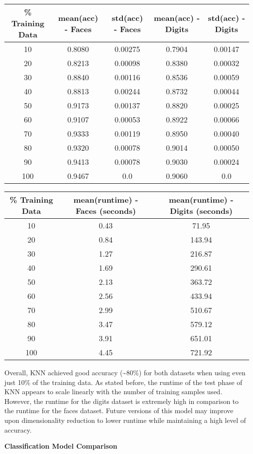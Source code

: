 \documentclass[11pt]{article}
\begin{document}
    \begin{center}
    \begin{tabular}{||c|c c|c c||}
     \hline
     \% Training Data & mean(acc) - Faces & std(acc) - Faces & mean(acc) - Digits & std(acc) - Digits \\ [0.5ex]
     \hline\hline
     10 & 0.8080 & 0.00275 & 0.7904 & 0.00147 \\
     \hline
     20 & 0.8213 & 0.00098 & 0.8380 & 0.00032 \\
     \hline
     30 & 0.8840 & 0.00116 & 0.8536 & 0.00059 \\
     \hline
     40 & 0.8813 & 0.00244 & 0.8732 & 0.00044 \\
     \hline
     50 & 0.9173 & 0.00137 & 0.8820 & 0.00025 \\
     \hline
     60 & 0.9107 & 0.00053 & 0.8922 & 0.00066 \\
     \hline
     70 & 0.9333 & 0.00119 & 0.8950 & 0.00040 \\
     \hline
     80 & 0.9320 & 0.00078 & 0.9014 & 0.00050 \\
     \hline
     90 & 0.9413 & 0.00078 & 0.9030 & 0.00024 \\
     \hline
     100 & 0.9467 & 0.0 & 0.9060 & 0.0 \\
     \hline
    \end{tabular}
    \begin{tabular}{||c|c|c||}
     \hline
     \% Training Data & mean(runtime) - Faces (seconds) & mean(runtime) - Digits (seconds) \\ [0.5ex]
     \hline\hline
     10 & 0.43 & 71.95 \\
     \hline
     20 & 0.84 & 143.94 \\
     \hline
     30 & 1.27 & 216.87 \\
     \hline
     40 & 1.69 & 290.61 \\
     \hline
     50 & 2.13 & 363.72 \\
     \hline
     60 & 2.56 & 433.94 \\
     \hline
     70 & 2.99 & 510.67 \\
     \hline
     80 & 3.47 & 579.12 \\
     \hline
     90 & 3.91 & 651.01 \\
     \hline
     100 & 4.45 & 721.92 \\
     \hline
    \end{tabular}
    \end{center}
    \normalsize
    Overall, KNN achieved good accuracy (\textasciitilde 80\%) for both datasets when using even just 10\% of the training data.
    As stated before, the runtime of the test phase of KNN appears to scale linearly with the number
    of training samples used.
    However, the runtime for the digits dataset is extremely high in comparison to the runtime for the faces dataset.
    Future versions of this model may improve upon dimensionality reduction to lower runtime while maintaining a high level of accuracy.
    \begin{center}
        \Large
        \textbf{Classification Model Comparison}
    \end{center}
    \normalsize
    
\end{document}
